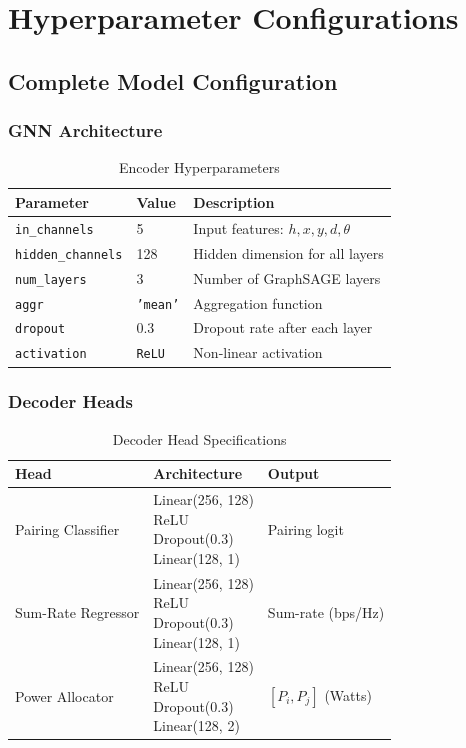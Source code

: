 \chapter{Hyperparameter Configurations}
\label{app:hyperparams}

\section{Complete Model Configuration}

\subsection{GNN Architecture}

\begin{table}[H]
\centering
\begin{tabular}{llp{6cm}}
\toprule
\textbf{Parameter} & \textbf{Value} & \textbf{Description} \\
\midrule
\texttt{in\_channels} & 5 & Input features: $h, x, y, d, \theta$ \\
\texttt{hidden\_channels} & 128 & Hidden dimension for all layers \\
\texttt{num\_layers} & 3 & Number of GraphSAGE layers \\
\texttt{aggr} & \texttt{'mean'} & Aggregation function \\
\texttt{dropout} & 0.3 & Dropout rate after each layer \\
\texttt{activation} & \texttt{ReLU} & Non-linear activation \\
\bottomrule
\end{tabular}
\caption{Encoder Hyperparameters}
\end{table}

\subsection{Decoder Heads}

\begin{table}[H]
\centering
\begin{tabular}{llp{6cm}}
\toprule
\textbf{Head} & \textbf{Architecture} & \textbf{Output} \\
\midrule
Pairing Classifier & \makecell[l]{Linear(256, 128) \\ ReLU \\ Dropout(0.3) \\ Linear(128, 1)} & Pairing logit \\
\midrule
Sum-Rate Regressor & \makecell[l]{Linear(256, 128) \\ ReLU \\ Dropout(0.3) \\ Linear(128, 1)} & Sum-rate (bps/Hz) \\
\midrule
Power Allocator & \makecell[l]{Linear(256, 128) \\ ReLU \\ Dropout(0.3) \\ Linear(128, 2)} & $[P_i, P_j]$ (Watts) \\
\bottomrule
\end{tabular}
\caption{Decoder Head Specifications}
\end{table}

